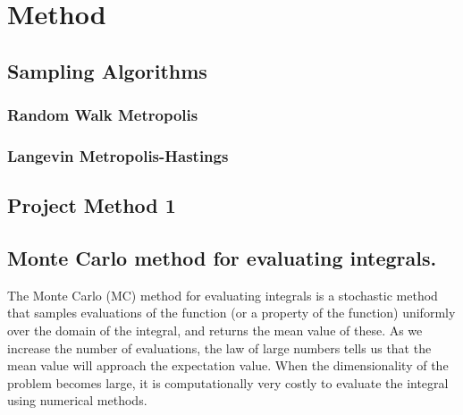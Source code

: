 \section{Method}\label{sec:Method}

\subsection{Sampling Algorithms}

\subsubsection{Random Walk Metropolis}

\subsubsection{Langevin Metropolis-Hastings}

\subsection{Project Method 1}\label{sec:project method}

\subsection*{Monte Carlo method for evaluating integrals.}
The Monte Carlo (MC) method for evaluating integrals is a stochastic method that samples evaluations of the function (or a property of the function) uniformly over the domain of the integral, and returns the mean value of these. As we increase the number of evaluations, the law of large numbers tells us that the mean value will approach the expectation value. When the dimensionality of the problem becomes large, it is computationally very costly to evaluate the integral using numerical methods.

